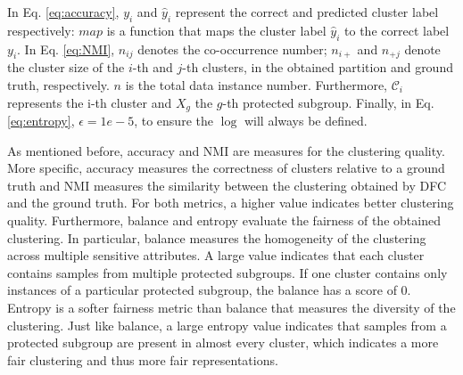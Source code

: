 In Eq. \ref{eq:accuracy}, $y_i$ and $\hat{y}_i$ represent the correct and predicted cluster label respectively: $map$ is a function that maps the cluster label $\hat{y}_i$ to the correct label $y_i$. In 
Eq. \ref{eq:NMI}, $n_{ij}$ denotes the co-occurrence number; $n_{i+}$ and $n_{+j}$ denote the cluster size of the $i$-th and $j$-th clusters, in the obtained partition and ground truth, respectively. $n$ is the total data instance number. Furthermore, $\mathcal{C}_i$ represents the i-th cluster and $X_g$ the $g$-th protected subgroup. Finally, in Eq. \ref{eq:entropy}, $\epsilon=1e-5$, to ensure the $\log$ will always be defined.

As mentioned before, accuracy and NMI are measures for the clustering quality. More specific, accuracy measures the correctness of clusters relative to a ground truth and NMI measures the similarity between the clustering obtained by DFC and the ground truth. For both metrics, a higher value indicates better clustering quality. Furthermore, balance and entropy evaluate the fairness of the obtained clustering. In particular, balance measures the homogeneity of the clustering across multiple sensitive attributes. A large value indicates that each cluster contains samples from multiple protected subgroups. If one cluster contains only instances of a particular protected subgroup, the balance has a score of $0$.
Entropy is a softer fairness metric than balance that measures the diversity of the clustering. Just like balance, a large entropy value indicates that samples from a protected subgroup are present in almost every cluster, which indicates a more fair clustering and thus more fair representations.






